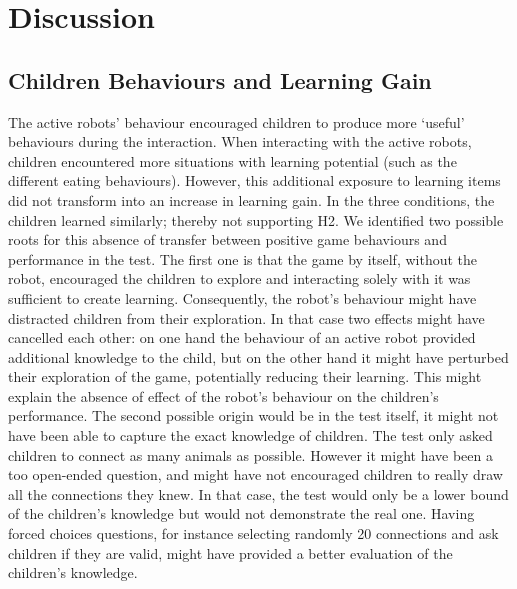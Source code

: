 %
%


\section{Discussion} \label{sec:tutoring_discussion}

\subsection{Children Behaviours and Learning Gain}

The active robots' behaviour encouraged children to produce more `useful' behaviours during the interaction. When interacting with the active robots, children encountered more situations with learning potential (such as the different eating behaviours). However, this additional exposure to learning items did not transform into an increase in learning gain. In the three conditions, the children learned similarly; thereby not supporting H2. We identified two possible roots for this absence of transfer between positive game behaviours and performance in the test. The first one is that the game by itself, without the robot, encouraged the children to explore and interacting solely with it was sufficient to create learning. Consequently, the robot's behaviour might have distracted children from their exploration. In that case two effects might have cancelled each other: on one hand the behaviour of an active robot provided additional knowledge to the child, but on the other hand it might have perturbed their exploration of the game, potentially reducing their learning. This might explain the absence of effect of the robot's behaviour on the children's performance. The second possible origin would be in the test itself, it might not have been able to capture the exact knowledge of children. The test only asked children to connect as many animals as possible. However it might have been a too open-ended question, and might have not encouraged children to really draw all the connections they knew. In that case, the test would only be a lower bound of the children's knowledge but would not demonstrate the real one. Having forced choices questions, for instance selecting randomly 20 connections and ask children if they are valid, might have provided a better evaluation of the children's knowledge. 

